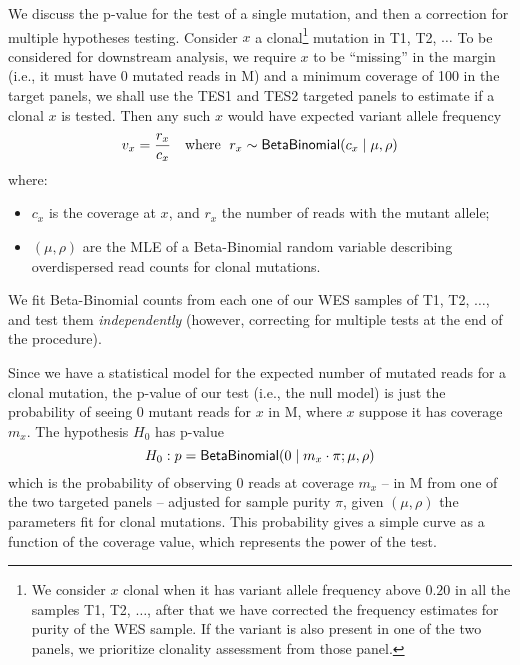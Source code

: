 \documentclass[10pt]{article}
\begin{document}
We  discuss the p-value for the test of a single mutation, and then a correction for multiple hypotheses testing.
Consider $x$ a   clonal\footnote{We consider  $x$   clonal when it has variant allele frequency above    $0.20$ in all the samples {\sf T1},  {\sf T2}, $\ldots$, after that we have corrected the   frequency estimates for purity of the WES sample. If the variant is also present in one of the two panels, we prioritize clonality assessment from those panel.
} 
mutation  in   {\sf T1},  {\sf T2}, $\ldots$  To be considered for downstream analysis, we require $x$ to be 
 ``missing'' in the margin (i.e., it must have 0 mutated reads in {\sf M}) and a minimum coverage of 100 in the target panels,  we shall use the TES1 and TES2 targeted panels to estimate if a clonal $x$ is tested. Then any such $x$ would have expected variant allele frequency 
\begin{align}
v_x = \dfrac{r_x}{c_x}  && 
\text{where }\;
 r_x \sim {\sf BetaBinomial}(c_x\mid \mu, \rho)
\end{align}
where:
\begin{itemize}
\item $c_x$ is the coverage at $x$, and $r_x$  the number of reads with the mutant allele;
\item $(\mu, \rho)$ are the MLE of a Beta-Binomial random variable describing overdispersed read counts for clonal mutations.
\end{itemize}
We  fit  Beta-Binomial counts from each one of our WES samples of  {\sf T1},  {\sf T2}, $\ldots$, and test them {\em independently} (however, correcting for multiple tests at the end of the procedure). 

Since we have a statistical model for the expected number of mutated reads for a clonal mutation, the p-value of our test (i.e., the null model) is just the probability of seeing 0 mutant reads for $x$ in {\sf M}, where $x$ suppose it has coverage $m_x$.
%
%
%
The hypothesis $H_0$ has p-value
\[
H_0: p = {\sf BetaBinomial}(0 \mid m_x \cdot \pi ; \mu, \rho) 
\]
% 
%
which is the probability of observing 0 reads at coverage $m_x$ -- in {\sf M} from one of the two targeted panels --  adjusted for sample purity  $\pi$, given $(\mu, \rho)$  the parameters fit  for clonal mutations. This probability gives  a simple curve as a function of the coverage value, which represents the power of the test.
\end{document}
